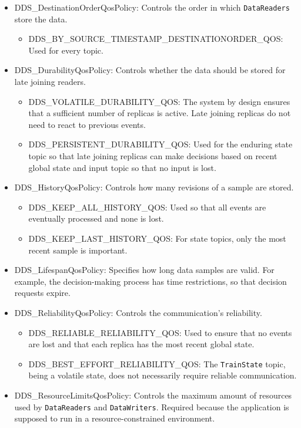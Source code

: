 \begin{itemize}
\item DDS\_DestinationOrderQosPolicy: Controls the order in which \texttt{DataReaders} store the data.
	\begin{itemize}
	\item DDS\_BY\_SOURCE\_TIMESTAMP\_DESTINATIONORDER\_QOS: Used for every topic.
	\end{itemize}
\item DDS\_DurabilityQosPolicy: Controls whether the data should be stored for late joining readers.
	\begin{itemize}
	\item DDS\_VOLATILE\_DURABILITY\_QOS: The system by design ensures that a sufficient number of replicas is active. Late joining replicas do not need to react to previous events.
	\item DDS\_PERSISTENT\_DURABILITY\_QOS: Used for the enduring state topic so that late joining replicas can make decisions based on recent global state and input topic so that no input is lost.
	\end{itemize}
\item DDS\_HistoryQosPolicy: Controls how many revisions of a sample are stored.
	\begin{itemize}
	\item DDS\_KEEP\_ALL\_HISTORY\_QOS: Used so that all events are eventually processed and none is lost.
	\item DDS\_KEEP\_LAST\_HISTORY\_QOS: For state topics, only the most recent sample is important.
	\end{itemize}
\item DDS\_LifespanQosPolicy: Specifies how long data samples are valid. For example, the decision-making process has time restrictions, so that decision requests expire.
\item DDS\_ReliabilityQosPolicy: Controls the communication's reliability.
	\begin{itemize}
	\item DDS\_RELIABLE\_RELIABILITY\_QOS: Used to ensure that no events are lost and that each replica has the most recent global state.
	\item DDS\_BEST\_EFFORT\_RELIABILITY\_QOS: The \texttt{TrainState} topic, being a volatile state, does not necessarily require reliable communication.
	\end{itemize}
\item DDS\_ResourceLimitsQosPolicy: Controls the maximum amount of resources used by \texttt{DataReaders} and \texttt{DataWriters}. Required because the application is supposed to run in a resource-constrained environment.
\end{itemize}

